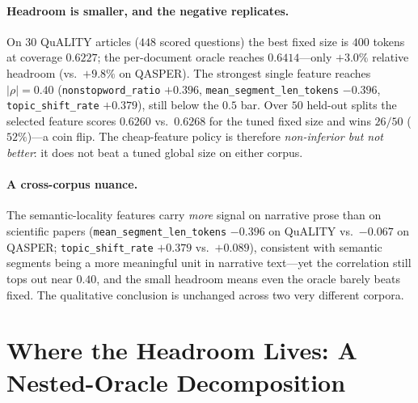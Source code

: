 \documentclass[11pt]{article}
\begin{document}
\paragraph{Headroom is smaller, and the negative replicates.} On $30$ QuALITY
articles ($448$ scored questions) the best fixed size is $400$ tokens at coverage
$0.6227$; the per-document oracle reaches $0.6414$---only $+3.0\%$ relative
headroom (vs.\ $+9.8\%$ on QASPER). The strongest single feature reaches
$|\rho|=0.40$ (\texttt{nonstopword\_ratio} $+0.396$,
\texttt{mean\_segment\_len\_tokens} $-0.396$, \texttt{topic\_shift\_rate}
$+0.379$), still below the $0.5$ bar. Over $50$ held-out splits the selected
feature scores $0.6260$ vs.\ $0.6268$ for the tuned fixed size and wins $26/50$
($52\%$)---a coin flip. The cheap-feature policy is therefore \emph{non-inferior
but not better}: it does not beat a tuned global size on either corpus.

\paragraph{A cross-corpus nuance.} The semantic-locality features carry
\emph{more} signal on narrative prose than on scientific papers
(\texttt{mean\_segment\_len\_tokens} $-0.396$ on QuALITY vs.\ $-0.067$ on QASPER;
\texttt{topic\_shift\_rate} $+0.379$ vs.\ $+0.089$), consistent with semantic
segments being a more meaningful unit in narrative text---yet the correlation
still tops out near $0.40$, and the small headroom means even the oracle barely
beats fixed. The qualitative conclusion is unchanged across two very different
corpora.

\section{Where the Headroom Lives: A Nested-Oracle Decomposition}
\label{sec:headroom}
\end{document}
